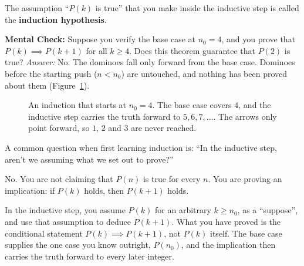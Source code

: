 The assumption ``$P(k)$ is true'' that you make inside the inductive step is called the \textbf{induction hypothesis}.

\begin{walkbox}
\textbf{Mental Check:} Suppose you verify the base case at $n_0 = 4$, and you prove that $P(k) \implies P(k+1)$ for all $k \ge 4$. Does this theorem guarantee that $P(2)$ is true?
\emph{Answer:} No. The dominoes fall only forward from the base case. Dominoes before the starting push ($n < n_0$) are untouched, and nothing has been proved about them (Figure~\ref{17:fig-start-at-four}).
\end{walkbox}

\begin{figure}[htbp]
\centering
{}
\caption{An induction that starts at $n_0 = 4$. The base case covers $4$, and the inductive step carries the truth forward to $5, 6, 7, \dots$. The arrows only point forward, so $1$, $2$ and $3$ are never reached.}
\label{17:fig-start-at-four}
\end{figure}

\begin{intuitionbox}
A common question when first learning induction is: ``In the inductive step, aren't we assuming what we set out to prove?''

No. You are not claiming that $P(n)$ is true for every $n$. You are proving an implication: if $P(k)$ holds, then $P(k+1)$ holds.

In the inductive step, you assume $P(k)$ for an arbitrary $k \ge n_0$, as a ``suppose'', and use that assumption to deduce $P(k+1)$. What you have proved is the conditional statement $P(k) \implies P(k+1)$, not $P(k)$ itself. The base case supplies the one case you know outright, $P(n_0)$, and the implication then carries the truth forward to every later integer.
\end{intuitionbox}

